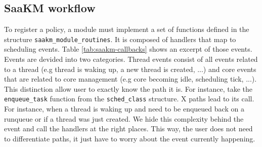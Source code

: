 \subsection{SaaKM workflow}
\par To register a policy, a module must implement a set of functions defined in the structure \texttt{saakm\_module\_routines}. It is composed of handlers that map to scheduling events. Table \ref{tab:saakm-callbacks} shows an excerpt of those events. Events are devided into two categories. Thread events consist of all events related to a thread (e.g thread is waking up, a new thread is created, ...) and core events that are related to core management (e.g core becoming idle, scheduling tick, ...). This distinction allow user to exactly know the path it is. For instance, take the \texttt{enqueue\_task} function from the \texttt{sched\_class} structure. X  paths lead to its call. For instance, when a thread is waking up and need to be enqueued back on a runqueue or if a thread was just created. We hide this complexity behind the event and call the handlers at the right places. This way, the user does not need to differentiate paths, it just have to worry about the event currently happening. \newline

